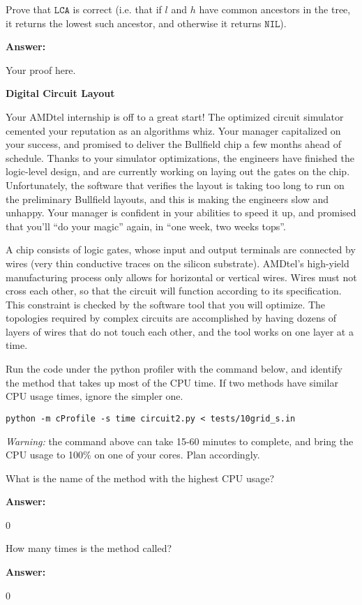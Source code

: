 \documentclass[12pt,twoside]{article}
\newcommand{\answer}{
 \par\medskip
 \textbf{Answer:}
}
\newcommand{\answerIu}{ \answer
Your proof here.
}
\newcommand{\answerIIa}{ \answer 
0
}
\newcommand{\answerIIb}{ \answer
0
}
\begin{document}
\begin{problems}
\begin{problemparts}
  \problempart {} Prove that $\texttt{LCA}$ is correct (i.e. that if
  $l$ and $h$ have common ancestors in the tree, it returns the lowest such
  ancestor, and otherwise it returns $\texttt{NIL}$).
\answerIu

\end{problemparts}


\problem {} \textbf{Digital Circuit Layout}

Your AMDtel internship is off to a great start! The optimized circuit simulator
cemented your reputation as an algorithms whiz. Your manager capitalized on your
success, and promised to deliver the Bullfield chip a few months ahead of schedule.
Thanks to your simulator optimizations, the engineers have finished the logic-level
design, and are currently working on laying out the gates on the chip. Unfortunately,
the software that verifies the layout is taking too long to run on the preliminary
Bullfield layouts, and this is making the engineers slow and unhappy. Your manager is
confident in your abilities to speed it up, and promised that you’ll “do your magic”
again, in “one week, two weeks tops”.

A chip consists of logic gates, whose input and output terminals are connected by
wires (very thin conductive traces on the silicon substrate). AMDtel’s high-yield
manufacturing process only allows for horizontal or vertical wires. Wires must not
cross each other, so that the circuit will function according to its specification.
This constraint is checked by the software tool that you will optimize. The
topologies required by complex circuits are accomplished by having dozens of layers
of wires that do not touch each other, and the tool works on one layer at a time.

\begin{problemparts}

\problempart {} Run the code under the python profiler with the command
below, and identify the method that takes up most of the CPU time. If two
methods have similar CPU usage times, ignore the simpler one.

\texttt{python -m cProfile -s time circuit2.py < tests/10grid\_s.in}

\textit{Warning:} the command above can take 15-60 minutes to complete, and
bring the CPU usage to 100\% on one of your cores. Plan accordingly.

What is the name of the method with the highest CPU usage?
\answerIIa

\problempart {} How many times is the method called?
\answerIIb


\end{problemparts}
\end{problems}
\end{document}
